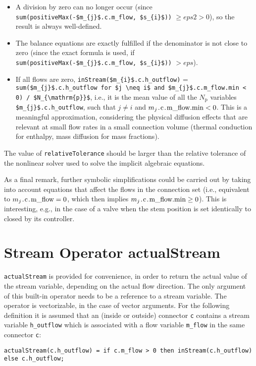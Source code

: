 \begin{nonnormative}
\begin{itemize}
\item
  A division by zero can no longer occur (since \lstinline[mathescape=true]!sum(positiveMax(-$m_{j}$.c.m_flow, $s_{i}$))! $\geq \mathit{eps2} > 0$),
  so the result is always well-defined.
\item
  The balance equations are exactly fulfilled if the denominator is not close to zero (since the exact formula is used, if
  \lstinline[mathescape=true]!sum(positiveMax(-$m_{j}$.c.m_flow, $s_{i}$))! $> \mathit{eps}$).
\item
  If all flows are zero,
  \lstinline[mathescape=true]!inStream($m_{i}$.c.h_outflow)! =
  \lstinline[mathescape=true]!sum($m_{j}$.c.h_outflow for $j \neq i$ and $m_{j}$.c.m_flow.min < 0) / $N_{\mathrm{p}}$!,
  i.e., it is the mean value of all the $N_{\mathrm{p}}$ variables
  \lstinline[mathescape=true]!$m_{j}$.c.h_outflow!, such that $j \neq i$ and
  $m_{j}\text{\lstinline!.c.m_flow.min!} < 0$. This is a
  meaningful approximation, considering the physical diffusion effects
  that are relevant at small flow rates in a small connection volume
  (thermal conduction for enthalpy, mass diffusion for mass fractions).
\end{itemize}

The value of \lstinline!relativeTolerance! should be larger than the relative
tolerance of the nonlinear solver used to solve the implicit algebraic
equations.

As a final remark, further symbolic simplifications could be
carried out by taking into account equations that affect the flows in
the connection set (i.e., equivalent to $m_{j}\text{\lstinline!.c.m_flow!} =
0$, which then implies $m_{j}\text{\lstinline!.c.m_flow.min!} \geq 0$). This is interesting, e.g., in the case of a valve when the stem
position is set identically to closed by its controller.
\end{nonnormative}

\section{Stream Operator actualStream}

\lstinline!actualStream! is provided for convenience, in
order to return the actual value of the stream variable, depending on
the actual flow direction. The only argument of this built-in operator
needs to be a reference to a stream variable. The operator is
vectorizable, in the case of vector arguments. For the following
definition it is assumed that an (inside or outside) connector \lstinline!c!
contains a stream variable \lstinline!h_outflow! which is associated with a flow
variable \lstinline!m_flow! in the same connector \lstinline!c!:
\begin{lstlisting}[language=modelica]
actualStream(c.h_outflow) = if c.m_flow > 0 then inStream(c.h_outflow) else c.h_outflow;
\end{lstlisting}

